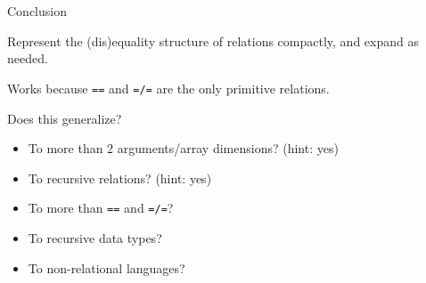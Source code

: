 \documentclass{beamer}
\begin{document}
\section{}

\begin{frame}
	\tableofcontents
\end{frame}

\begin{frame}{Conclusion}

	Represent the (dis)equality structure of relations compactly, and expand as needed.

	\vspace{1ex}

	\pause
	Works because \texttt{==} and \texttt{=/=} are the only primitive relations.
	
	\vspace{1ex}
	
	\pause
	Does this generalize?

	\begin{itemize}
		\item To more than 2 arguments/array dimensions? (hint: yes)
		\item To recursive relations? (hint: yes)
		\item To more than \texttt{==} and \texttt{=/=}?
		\item To recursive data types?
		\item To non-relational languages?
	\end{itemize}
	
\end{frame}
\end{document}
